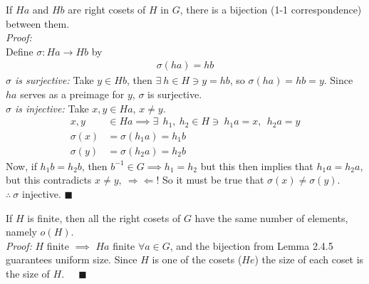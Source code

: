 \begin{lemma}
If $Ha$ and $Hb$ are right cosets of $H$ in $G$, there is a bijection (1-1 correspondence) between
them.\\
\textit{Proof:}\\
Define $\sigma: Ha\rightarrow Hb$ by
\begin{align}
    \sigma(ha)=hb \nonumber
\end{align}
\textit{$\sigma$ is surjective:} Take $y\in Hb$, then $\exists \ h\in H\ni y=hb$, so
$\sigma(ha)=hb=y$. Since $ha$ serves as a preimage for $y$, $\sigma$ is surjective.\\
\textit{$\sigma$ is injective:} Take $x,y \in Ha $, $x\neq y$.
\begin{align}
    x,y &\in Ha \implies \exists \ \ h_1,\ h_2\in H\ni \ h_1a=x, \ \ h_2a=y \nonumber \\
    \sigma(x)&=\sigma(h_1 a)=h_1 b \nonumber \\
    \sigma(y)&=\sigma(h_2 a)=h_2 b \nonumber
\end{align}
Now, if $h_1b=h_2b$, then $b^{-1}\in G \implies h_1=h_2$ but this then implies that $h_1a=h_2a$, but
this contradicts $x\neq y, \ \Rightarrow \Leftarrow$! So it must be true that
$\sigma(x)\neq \sigma(y)$.\\
$\therefore \ \sigma$ injective. $\blacksquare$
\end{lemma}
\setcounter{dummy_lemma}{4}
\begin{corollary}
If $H$ is finite, then all the right cosets of $G$ have the same number of elements, namely
$o(H)$.\\
\textit{Proof:} $H$ finite $\implies$ $Ha$ finite $\forall a \in G$, and the bijection from Lemma
2.4.5 guarantees uniform size. Since $H$ is one of the cosets ($He$) the size of each coset is the
size of $H$. $\ \ \ \ \ \blacksquare$
\end{corollary}

